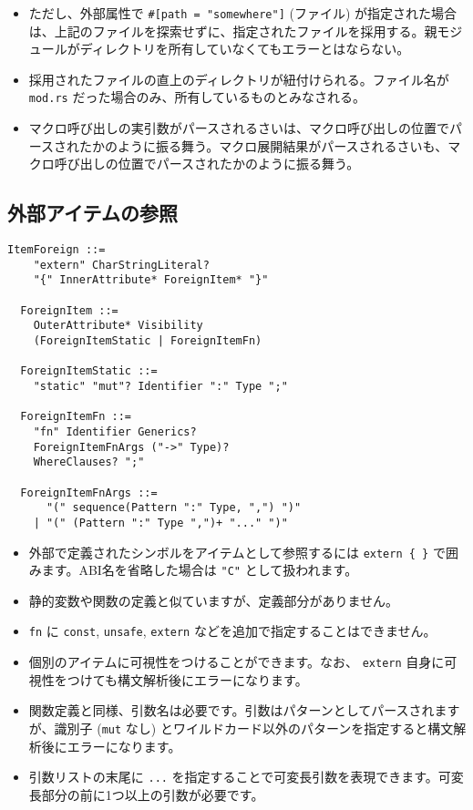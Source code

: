 \documentclass[dvipdfmx,uplatex,papersize,a4paper,10pt]{jsbook}
\theoremstyle{definition}
\begin{document}
\begin{itemize}
\begin{itemize}
      \item ただし、外部属性で \verb|#[path = "somewhere"]| (ファイル) が指定された場合は、上記のファイルを探索せずに、指定されたファイルを採用する。親モジュールがディレクトリを所有していなくてもエラーとはならない。
      \item 採用されたファイルの直上のディレクトリが紐付けられる。ファイル名が \verb|mod.rs| だった場合のみ、所有しているものとみなされる。
      \item マクロ呼び出しの実引数がパースされるさいは、マクロ呼び出しの位置でパースされたかのように振る舞う。マクロ展開結果がパースされるさいも、マクロ呼び出しの位置でパースされたかのように振る舞う。
    \end{itemize}
\end{itemize}

\subsection{外部アイテムの参照}

\begin{lstlisting}[language=BNFLike, gobble=2]
  ItemForeign ::=
    "extern" CharStringLiteral?
    "{" InnerAttribute* ForeignItem* "}"

  ForeignItem ::=
    OuterAttribute* Visibility
    (ForeignItemStatic | ForeignItemFn)

  ForeignItemStatic ::=
    "static" "mut"? Identifier ":" Type ";"

  ForeignItemFn ::=
    "fn" Identifier Generics?
    ForeignItemFnArgs ("->" Type)?
    WhereClauses? ";"

  ForeignItemFnArgs ::=
      "(" sequence(Pattern ":" Type, ",") ")"
    | "(" (Pattern ":" Type ",")+ "..." ")"
\end{lstlisting}

\begin{itemize}
  \item 外部で定義されたシンボルをアイテムとして参照するには \verb|extern { }| で囲みます。ABI名を省略した場合は \verb|"C"| として扱われます。
  \item 静的変数や関数の定義と似ていますが、定義部分がありません。
  \item \verb|fn| に \verb|const|, \verb|unsafe|, \verb|extern| などを追加で指定することはできません。
  \item 個別のアイテムに可視性をつけることができます。なお、 \verb|extern| 自身に可視性をつけても構文解析後にエラーになります。
  \item 関数定義と同様、引数名は必要です。引数はパターンとしてパースされますが、識別子 (\verb|mut| なし) とワイルドカード以外のパターンを指定すると構文解析後にエラーになります。
  \item 引数リストの末尾に \verb|...| を指定することで可変長引数を表現できます。可変長部分の前に1つ以上の引数が必要です。
\end{itemize}
\end{document}
